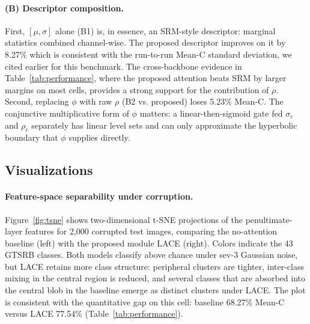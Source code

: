 \documentclass{bmvc2k}
\begin{document}
\paragraph{(B) Descriptor composition.} 

First, $[\mu, \sigma]$ alone (B1) is, in essence, an SRM-style descriptor: marginal statistics combined channel-wise. The proposed descriptor improves on it by 8.27\% which is consistent with the run-to-run Mean-C standard deviation, we cited earlier for this benchmark. The cross-backbone evidence in Table~\ref{tab:performance}, where the proposed attention beats SRM by larger margins on most cells, provides a strong support for the contribution of $\rho$. Second, replacing $\phi$ with raw $\rho$ (B2 vs. proposed) loses 5.23\% Mean-C. The conjunctive multiplicative form of $\phi$ matters: a linear-then-sigmoid gate fed $\sigma_c$ and $\rho_c$ separately has linear level sets and can only approximate the hyperbolic boundary that $\phi$ supplies directly.

\subsection{Visualizations}\label{Visualization}


\paragraph{Feature-space separability under corruption.}
Figure~\ref{fig:tsne} shows two-dimensional t-SNE projections of the penultimate-layer features for 2{,}000 corrupted test images, comparing the no-attention baseline (left) with the proposed module LACE (right).
Colors indicate the 43 GTSRB classes. Both models classify above chance under sev-3 Gaussian noise, but LACE retains more class structure: peripheral clusters are tighter, inter-class mixing in the central region is reduced, and several classes that are absorbed into
the central blob in the baseline emerge as distinct clusters under LACE. The plot is consistent with the quantitative gap on this cell: baseline 68.27\% Mean-C versus LACE 77.54\% (Table~\ref{tab:performance}).
 
\end{document}
